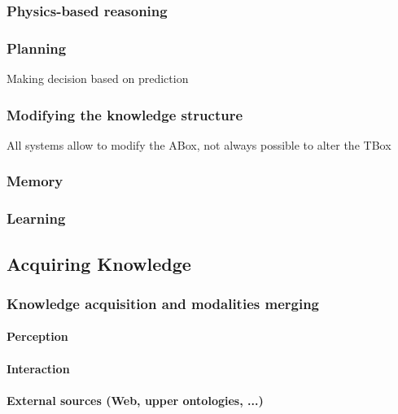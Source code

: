\documentclass[a4paper, twocolumn]{article}
\begin{document}
\subsubsection{Physics-based reasoning}
\label{sect|physics}

\subsubsection{Planning}
\label{sect|planning}

Making decision based on prediction

\subsubsection{Modifying the knowledge structure}

All systems allow to modify the ABox, not always possible to alter the TBox

\subsubsection{Memory}
\label{sect|memory}



\subsubsection{Learning}
\label{sect|learning}

\subsection{Acquiring Knowledge}

\subsubsection{Knowledge acquisition and modalities merging}
\label{sect|knowledge-acquisition}

\paragraph{Perception}
\paragraph{Interaction}
\paragraph{External sources (Web, upper ontologies, ...)}
\end{document}

